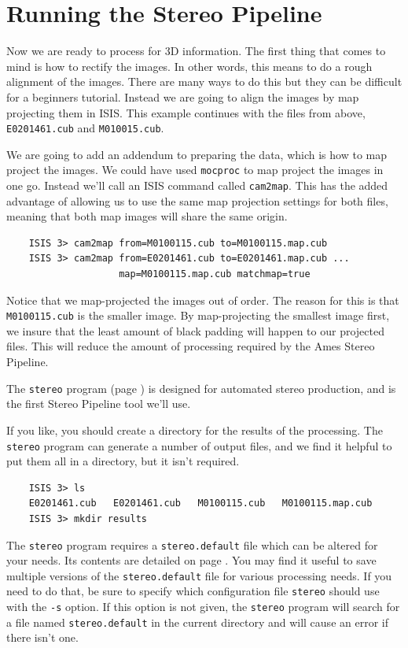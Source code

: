 \section{Running the Stereo Pipeline}

Now we are ready to process for 3D information. The first thing that
comes to mind is how to rectify the images. In other words, this means
to do a rough alignment of the images. There are many ways to do this
but they can be difficult for a beginners tutorial. Instead we are
going to align the images by map projecting them in ISIS. This example
continues with the files from above, \texttt{E0201461.cub} and
\texttt{M010015.cub}.

We are going to add an addendum to preparing the data, which is how to
map project the images. We could have used \texttt{mocproc} to map
project the images in one go. Instead we'll call an \ac{ISIS} command
called \texttt{cam2map}. This has the added advantage of allowing us
to use the same map projection settings for both files, meaning that
both map images will share the same origin.

\begin{verbatim}
    ISIS 3> cam2map from=M0100115.cub to=M0100115.map.cub
    ISIS 3> cam2map from=E0201461.cub to=E0201461.map.cub ...
                    map=M0100115.map.cub matchmap=true
\end{verbatim}
\noindent

Notice that we map-projected the images out of order. The reason for
this is that \texttt{M0100115.cub} is the smaller image. By
map-projecting the smallest image first, we insure that the least
amount of black padding will happen to our projected files. This will
reduce the amount of processing required by the Ames Stereo
Pipeline.

The \texttt{stereo} program (page \pageref{stereo}) is designed for
automated stereo production, and is the first Stereo Pipeline tool
we'll use.

If you like, you should create a directory for the results of the
processing.  The \texttt{stereo} program can generate a number of
output files, and we find it helpful to put them all in a directory,
but it isn't required.

\begin{verbatim}
    ISIS 3> ls
    E0201461.cub   E0201461.cub   M0100115.cub   M0100115.map.cub
    ISIS 3> mkdir results
\end{verbatim}
\noindent

The \texttt{stereo} program requires a \texttt{stereo.default} file
which can be altered for your needs.  Its contents are detailed on
page \pageref{ch:stereodefault}.  You may find it useful to save
multiple versions of the \texttt{stereo.default} file for various
processing needs. If you need to do that, be sure to specify which
configuration file \texttt{stereo} should use with the \texttt{-s}
option.  If this option is not given, the \texttt{stereo} program
will search for a file named \texttt{stereo.default} in the current
directory and will cause an error if there isn't one.

